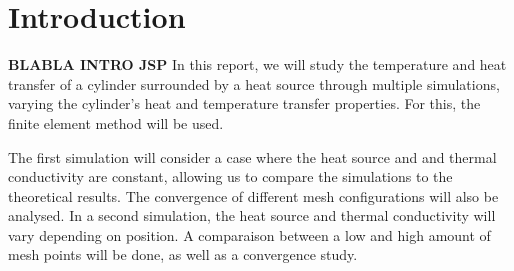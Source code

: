 \section{Introduction}

\textbf{BLABLA INTRO JSP}
In this report, we will study the temperature and heat transfer of a cylinder surrounded by a heat source through multiple simulations, varying the cylinder's heat and temperature transfer properties. For this, the finite element method will be used.

The first simulation will consider a case where the heat source and and thermal conductivity are constant, allowing us to compare the simulations to the theoretical results. The convergence of different mesh configurations will also be analysed. In a second simulation, the heat source and thermal conductivity will vary depending on position. A comparaison between a low and high amount of mesh points will be done, as well as a convergence study.